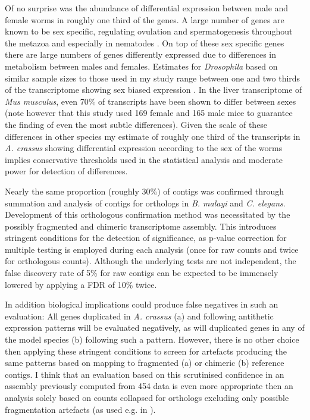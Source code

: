 Of no surprise was the abundance of differential expression between
male and female worms in roughly one third of the genes. A large
number of genes are known to be sex specific, regulating ovulation and
spermatogenesis throughout the metazoa and especially in nematodes
\cite{pmid15371532}. On top of these sex specific genes there are
large numbers of genes differently expressed due to differences in
metabolism between males and females. Estimates for
\textit{Drosophila} based on similar sample sizes to those used in my
study range between one and two thirds of the transcriptome showing
sex biased expression \cite{pmid11726925}. In the liver transcriptome
of \textit{Mus musculus}, even 70\% of transcripts have been shown to
differ between sexes \cite{pmid16825664} (note however that this study
used 169 female and 165 male mice to guarantee the finding of even the
most subtle differences). Given the scale of these differences in
other species my estimate of roughly one third of the transcripts in
\textit{A. crassus} showing differential expression according to the
sex of the worms implies conservative thresholds used in the
statistical analysis and moderate power for detection of differences.

Nearly the same proportion (roughly 30\%) of contigs was confirmed
through summation and analysis of contigs for orthologs in
\textit{B. malayi} and \textit{C. elegans}. Development of this
orthologous confirmation method was necessitated by the possibly
fragmented and chimeric transcriptome assembly. This introduces
stringent conditions for the detection of significance, as p-value
correction for multiple testing is employed during each analysis (once
for raw counts and twice for orthologous counts). Although the
underlying tests are not independent, the false discovery rate of 5\%
for raw contigs can be expected to be immensely lowered by applying a
FDR of 10\% twice.

In addition biological implications could produce false negatives in
such an evaluation: All genes duplicated in \textit{A. crassus} (a)
and following antithetic expression patterns will be evaluated
negatively, as will duplicated genes in any of the model species (b)
following such a pattern. However, there is no other choice then
applying these stringent conditions to screen for artefacts producing
the same patterns based on mapping to fragmented (a) or chimeric (b)
reference contigs. I think that an evaluation based on this
scrutinised confidence in an assembly previously computed from 454
data is even more appropriate then an analysis solely based on counts
collapsed for orthologs excluding only possible fragmentation
artefacts (as used e.g. in \cite{pmid22084086}).

